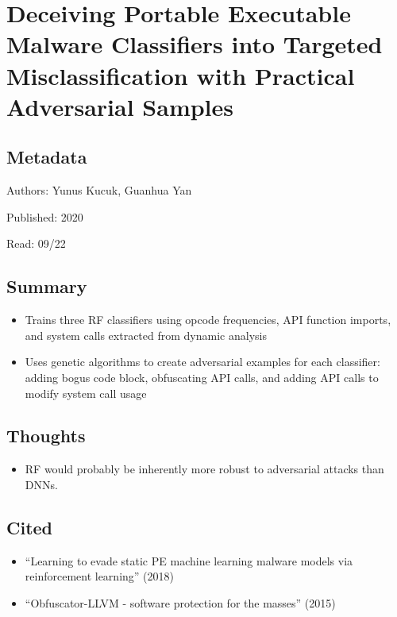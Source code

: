 \documentclass{article}
\begin{document}

\section*{Deceiving Portable Executable Malware Classifiers into Targeted Misclassification with Practical Adversarial Samples}

\subsection*{Metadata}

\noindent Authors: Yunus Kucuk, Guanhua Yan

\noindent Published: 2020

\noindent Read: 09/22

\subsection*{Summary}
\begin{itemize}
	\item Trains three RF classifiers using opcode frequencies, API function imports, and system calls extracted from dynamic analysis
	\item Uses genetic algorithms to create adversarial examples for each classifier: adding bogus code block, obfuscating API calls, and adding API calls to modify system call usage
\end{itemize}

\subsection*{Thoughts}
\begin{itemize}
	\item RF would probably be inherently more robust to adversarial attacks than DNNs.
\end{itemize}

\subsection*{Cited}
\begin{itemize}
	\item ``Learning to evade static PE machine learning malware models via reinforcement learning'' (2018)
	\item ``Obfuscator-LLVM - software protection for the masses'' (2015)
\end{itemize}
\end{document}
